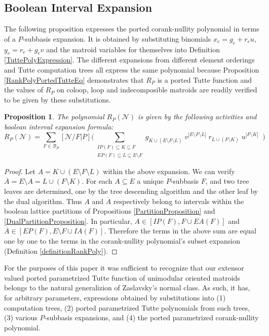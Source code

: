 \documentclass[12pt]{article}
\newtheorem{proposition}[theorem]{Proposition}
\theoremstyle{definition}
\newcommand{\scomp}[1]{\ensuremath{\overline{#1}}}
\newcommand{\Card}[1]{\ensuremath{{\left|#1\right|}}}
\begin{document}
\subsection{Boolean Interval Expansion}

The following proposition 
expresses the ported corank-nullity polynomial
in terms of a $P$-subbasis expansion.  It is obtained by substituting
binomials $x_e=g_e+r_eu$, $y_e=r_e+g_ev$ and the matroid variables for
themselves into Definition
\ref{TuttePolyExpression}.  The different expansions from
different element orderings and Tutte computation trees all 
express the same polynomial because Proposition
\ref{RankPolyPortedTutteEq} demonstrates that $R_P$ is a ported
Tutte function and the values of $R_P$ on coloop, loop and
indecomposible matroids are readily verified to be given
by these substitutions.  

\begin{proposition}
The polynomial $R_P(\mathcal{N})$ is given
by the following activities and boolean interval expansion formula:
\begin{equation}
R_P(\mathcal{N})=
\sum_{F\in \mathcal{B}_P}[\mathcal{N}/F|P]
\Big(
\sum_{\substack{
       IP(F)\subseteq K \subseteq F\\
       EP(F)\subseteq L \subseteq E\setminus F
      }}
 g_{K\cup (E\setminus F\setminus L)}\;
 v^{\Card{E\setminus F\setminus L}}\;
 r_{L\cup (F\setminus K)}\;
 u^{\Card{F\setminus K}}\;\;
\Big)
\end{equation}
\end{proposition}

\begin{proof}
Let $A=K\cup (E\setminus F\setminus L)$ within the above expansion.
We can verify $\scomp{A}=E\setminus A=L\cup (F\setminus K)$.
For each $A\subseteq E$ a unique $P$-subbasis $F$, and two tree leaves
are determined, one by the tree descending algorithm and the other leaf
by the dual algorithm.  Thus $A$ and $\scomp{A}$ respectively belong
to intervals within the boolean lattice partitions of Propositions
\ref{PartitionProposition} and \ref{DualPartitionProposition}.  In particular, 
$A\in[IP(F),F\cup EA(F)]$ and 
$\scomp{A}\in[EP(F),E\setminus F\cup IA(F)]$.
Therefore the terms in the above sum are equal one by one to the terms in
the corank-nullity polynomial's subset expansion
(Definition \ref{definitionRankPoly}).
\end{proof}



For the purposes of this paper it was sufficient to recognize
that our extensor valued ported parametrized Tutte function of 
unimodular oriented matroids belongs to the natural generalizion 
of Zaslavsky's normal class.  As such, it has, for arbitrary
parameters, expressions obtained by substitutions into
(1) computation trees, (2) ported parametrized Tutte polynomials
from such trees, (3) various $P$-subbasis expansions, 
and (4) the ported parametrized corank-nullity polynomial.
\end{document}
